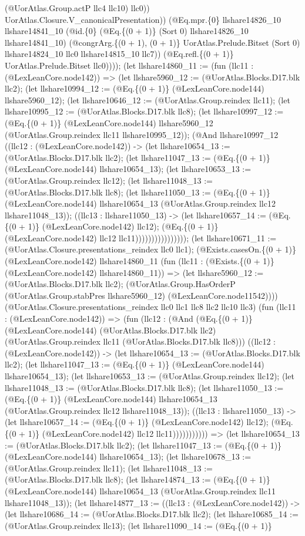 \documentclass[11pt]{article}
\begin{document}
(@UorAtlas.Group.actP llc4 llc10) llc0)) UorAtlas.Closure.V\_canonicalPresentation)) (@Eq.mpr.\{0\} llshare14826\_10 llshare14841\_10 (@id.\{0\} (@Eq.\{(0 + 1)\} (Sort 0) llshare14826\_10 llshare14841\_10) (@congrArg.\{(0 + 1), (0 + 1)\} UorAtlas.Prelude.Bitset (Sort 0) llshare14824\_10 llc0 llshare14815\_10 llc7)) (@Eq.refl.\{(0 + 1)\} UorAtlas.Prelude.Bitset llc0)))); (let llshare14860\_11 := (fun (llc11 : (@LexLeanCore.node142)) => (let llshare5960\_12 := (@UorAtlas.Blocks.D17.blk llc2); (let llshare10994\_12 := (@Eq.\{(0 + 1)\} (@LexLeanCore.node144) llshare5960\_12); (let llshare10646\_12 := (@UorAtlas.Group.reindex llc11); (let llshare10995\_12 := (@UorAtlas.Blocks.D17.blk llc8); (let llshare10997\_12 := (@Eq.\{(0 + 1)\} (@LexLeanCore.node144) llshare5960\_12 (@UorAtlas.Group.reindex llc11 llshare10995\_12)); (@And llshare10997\_12 ((llc12 : (@LexLeanCore.node142)) -> (let llshare10654\_13 := (@UorAtlas.Blocks.D17.blk llc2); (let llshare11047\_13 := (@Eq.\{(0 + 1)\} (@LexLeanCore.node144) llshare10654\_13); (let llshare10653\_13 := (@UorAtlas.Group.reindex llc12); (let llshare11048\_13 := (@UorAtlas.Blocks.D17.blk llc8); (let llshare11050\_13 := (@Eq.\{(0 + 1)\} (@LexLeanCore.node144) llshare10654\_13 (@UorAtlas.Group.reindex llc12 llshare11048\_13)); ((llc13 : llshare11050\_13) -> (let llshare10657\_14 := (@Eq.\{(0 + 1)\} (@LexLeanCore.node142) llc12); (@Eq.\{(0 + 1)\} (@LexLeanCore.node142) llc12 llc11)))))))))))))))); (let llshare10671\_11 := (@UorAtlas.Closure.presentations\_reindex llc0 llc1); (@Exists.casesOn.\{(0 + 1)\} (@LexLeanCore.node142) llshare14860\_11 (fun (llc11 : (@Exists.\{(0 + 1)\} (@LexLeanCore.node142) llshare14860\_11)) => (let llshare5960\_12 := (@UorAtlas.Blocks.D17.blk llc2); (@UorAtlas.Group.HasOrderP (@UorAtlas.Group.stabPres llshare5960\_12) (@LexLeanCore.node11542)))) (@UorAtlas.Closure.presentations\_reindex llc0 llc1 llc8 llc2 llc10 llc3) (fun (llc11 : (@LexLeanCore.node142)) => (fun (llc12 : (@And (@Eq.\{(0 + 1)\} (@LexLeanCore.node144) (@UorAtlas.Blocks.D17.blk llc2) (@UorAtlas.Group.reindex llc11 (@UorAtlas.Blocks.D17.blk llc8))) ((llc12 : (@LexLeanCore.node142)) -> (let llshare10654\_13 := (@UorAtlas.Blocks.D17.blk llc2); (let llshare11047\_13 := (@Eq.\{(0 + 1)\} (@LexLeanCore.node144) llshare10654\_13); (let llshare10653\_13 := (@UorAtlas.Group.reindex llc12); (let llshare11048\_13 := (@UorAtlas.Blocks.D17.blk llc8); (let llshare11050\_13 := (@Eq.\{(0 + 1)\} (@LexLeanCore.node144) llshare10654\_13 (@UorAtlas.Group.reindex llc12 llshare11048\_13)); ((llc13 : llshare11050\_13) -> (let llshare10657\_14 := (@Eq.\{(0 + 1)\} (@LexLeanCore.node142) llc12); (@Eq.\{(0 + 1)\} (@LexLeanCore.node142) llc12 llc11))))))))))) => (let llshare10654\_13 := (@UorAtlas.Blocks.D17.blk llc2); (let llshare11047\_13 := (@Eq.\{(0 + 1)\} (@LexLeanCore.node144) llshare10654\_13); (let llshare10678\_13 := (@UorAtlas.Group.reindex llc11); (let llshare11048\_13 := (@UorAtlas.Blocks.D17.blk llc8); (let llshare14874\_13 := (@Eq.\{(0 + 1)\} (@LexLeanCore.node144) llshare10654\_13 (@UorAtlas.Group.reindex llc11 llshare11048\_13)); (let llshare14877\_13 := ((llc13 : (@LexLeanCore.node142)) -> (let llshare10686\_14 := (@UorAtlas.Blocks.D17.blk llc2); (let llshare10685\_14 := (@UorAtlas.Group.reindex llc13); (let llshare11090\_14 := (@Eq.\{(0 + 1)\} 
\end{document}
